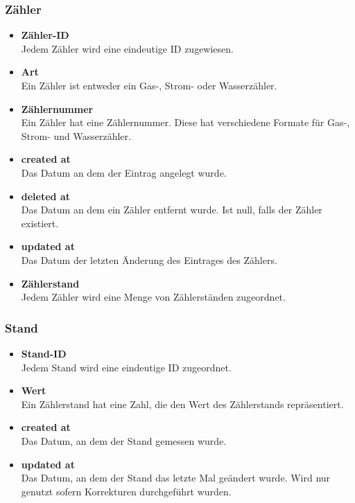 \subsubsection*{Zähler}
	\begin{itemize}
	    \item \textbf{Zähler-ID}\hfill\\
	    Jedem Zähler wird eine eindeutige ID zugewiesen.
		\item \textbf{Art}\hfill \\
		Ein Zähler ist entweder ein Gas-, Strom- oder Wasserzähler.
		\item \textbf{Zählernummer}\hfill \\
		Ein Zähler hat eine Zählernummer. Diese hat verschiedene Formate für Gas-, Strom- und Wasserzähler.
		\item \textbf{created at}\hfill \\
		Das Datum an dem der Eintrag angelegt wurde.
		\item \textbf{deleted at}\hfill \\
		Das Datum an dem ein Zähler entfernt wurde. Ist null, falls der Zähler existiert.
		\item \textbf{updated at}\hfill \\
		Das Datum der letzten Änderung des Eintrages des Zählers.
		\item \textbf{Zählerstand}\hfill\\
		Jedem Zähler wird eine Menge von Zählerständen zugeordnet.
	\end{itemize}
\subsubsection*{Stand}
	\begin{itemize}
	    \item \textbf{Stand-ID}\hfill\\
	    Jedem Stand wird eine eindeutige ID zugeordnet.
		\item \textbf{Wert}\hfill \\
		Ein Zählerstand hat eine Zahl, die den Wert des Zählerstands repräsentiert.
		\item \textbf{created at}\hfill \\
		Das Datum, an dem der Stand gemessen wurde.
		\item \textbf{updated at}\hfill \\
		Das Datum, an dem der Stand das letzte Mal geändert wurde. Wird nur genutzt sofern Korrekturen durchgeführt wurden.
	\end{itemize}
